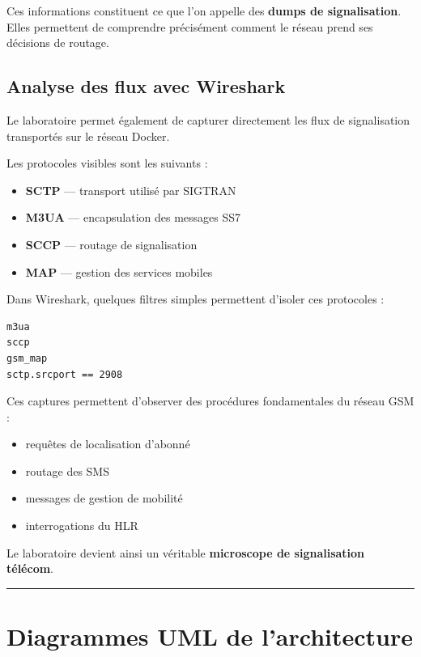 \documentclass[
]{article}
\providecommand{\tightlist}{%
  \setlength{\itemsep}{0pt}\setlength{\parskip}{0pt}}
\begin{document}
Ces informations constituent ce que l'on appelle des \textbf{dumps de
signalisation}. Elles permettent de comprendre précisément comment le
réseau prend ses décisions de routage.

\subsection{Analyse des flux avec
Wireshark}\label{analyse-des-flux-avec-wireshark}

Le laboratoire permet également de capturer directement les flux de
signalisation transportés sur le réseau Docker.

Les protocoles visibles sont les suivants :

\begin{itemize}
\tightlist
\item
  \textbf{SCTP} --- transport utilisé par SIGTRAN
\item
  \textbf{M3UA} --- encapsulation des messages SS7
\item
  \textbf{SCCP} --- routage de signalisation
\item
  \textbf{MAP} --- gestion des services mobiles
\end{itemize}

Dans Wireshark, quelques filtres simples permettent d'isoler ces
protocoles :

\begin{verbatim}
m3ua
sccp
gsm_map
sctp.srcport == 2908
\end{verbatim}

Ces captures permettent d'observer des procédures fondamentales du
réseau GSM :

\begin{itemize}
\tightlist
\item
  requêtes de localisation d'abonné
\item
  routage des SMS
\item
  messages de gestion de mobilité
\item
  interrogations du HLR
\end{itemize}

Le laboratoire devient ainsi un véritable \textbf{microscope de
signalisation télécom}.

\begin{center}\rule{0.5\linewidth}{0.5pt}\end{center}

\section{Diagrammes UML de
l'architecture}\label{diagrammes-uml-de-larchitecture}
\end{document}
